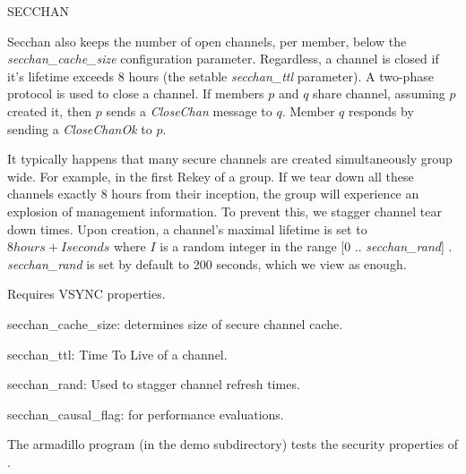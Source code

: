 \begin{Layer}{SECCHAN}
\begin{Protocol}
Secchan also keeps the number of open channels, per member, below the
{\it secchan\_cache\_size} configuration parameter. Regardless, a
channel is closed if it's lifetime exceeds 8 hours (the setable {\it
secchan\_ttl} parameter).  A two-phase protocol is used to close a
channel. If members $p$ and $q$ share channel, assuming $p$ created
it, then $p$ sends a {\it CloseChan} message to $q$.  Member $q$
responds by sending a {\it CloseChanOk} to $p$.

It typically happens that many secure channels are created
simultaneously group wide. For example, in the first Rekey of a
group. If we tear down all these channels exactly 8 hours from their
inception, the group will experience an explosion of management
information. To prevent this, we stagger channel tear down times.
Upon creation, a channel's maximal lifetime is set to $8 hours + I
seconds$ where $I$ is a random integer in the range [0 ..{\it
secchan\_rand}] . {\it secchan\_rand} is set by default to 200 seconds,
which we view as enough.

\end{Protocol}

\begin{Properties}
\item Requires VSYNC properties.
\end{Properties}

\begin{Parameters}
\item{secchan\_cache\_size:} determines size of secure channel cache. 
\item{secchan\_ttl:} Time To Live of a channel.
\item{secchan\_rand:} Used to stagger channel refresh times.
\item {secchan\_causal\_flag:} for performance evaluations.
\end{Parameters}

\begin{Sources}
\end{Sources}

\begin{GenEvent}
\end{GenEvent}

\begin{Testing}
\item 
The armadillo program (in the demo subdirectory) tests the security properties
of \ensemble.
\end{Testing}

\end{Layer}



